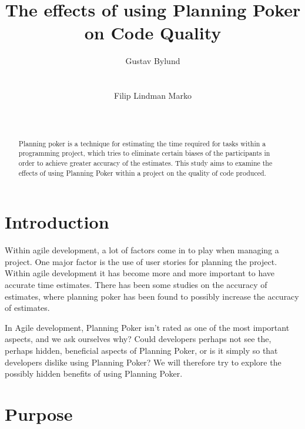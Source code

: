 \documentclass{sigchi}
\begin{document}
\title{The effects of using Planning Poker on Code Quality}

\author{
  \alignauthor Gustav Bylund\\
  \\
    \\
  \alignauthor Filip Lindman Marko\\
    \\
    \\
}

\maketitle

\begin{abstract}
Planning poker is a technique for estimating the time required for tasks
within a programming project, which tries to eliminate certain biases of
the participants in order to achieve greater accuracy of the estimates\cite{grenning2002planning}.
This study aims to examine the effects of using Planning Poker within a project on the quality of code produced.
\end{abstract}


\section{Introduction}
Within agile development, a lot of factors come in to play when managing a project. One major factor is the use of user stories for planning the project.
Within agile development it has become more and more important to have accurate time estimates.
There has been some studies on the accuracy of estimates, where planning poker has been found to
possibly increase the accuracy of estimates\cite{molokken2007combining}.

In Agile development, Planning Poker isn't rated as one of the most important aspects\cite{Williams:2012:ATT:2133806.2133823}, and we ask ourselves why? Could developers perhaps not see the, perhaps hidden, beneficial aspects of Planning Poker, or is it simply so that developers dislike using Planning Poker?
We will therefore try to explore the possibly hidden benefits of using Planning Poker.


\section{Purpose}
\end{document}
